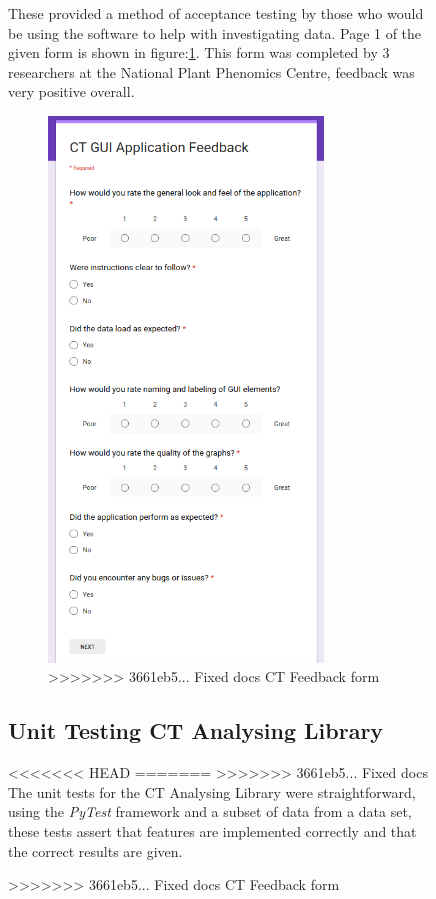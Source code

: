 \documentclass[11pt]{report}
\begin{document}
\begin{figure}[htbp]
{These provided a method of acceptance testing by those who would be using the software to help with investigating data. Page 1 of the given form is shown in figure:\ref{fig:org7c8d3f9}. This form was completed by 3 researchers at the National Plant Phenomics Centre, feedback was very positive overall.
\begin{figure}[htbp]
\centering
\includegraphics[width=7.3cm]{./images/feedbackform.png}
\caption{\label{fig:org7c8d3f9}
>>>>>>> 3661eb5... Fixed docs
CT Feedback form}
\end{figure}

\clearpage

\subsection{Unit Testing CT Analysing Library}
<<<<<<< HEAD
\label{sec:orgb79cce1}
=======
\label{sec:org37df8c2}
>>>>>>> 3661eb5... Fixed docs
The unit tests for the CT Analysing Library were straightforward, using the \emph{PyTest} framework and a subset of data from a data set, these tests assert that features are implemented correctly and that the correct results are given.


}
\end{figure}
\end{document}
